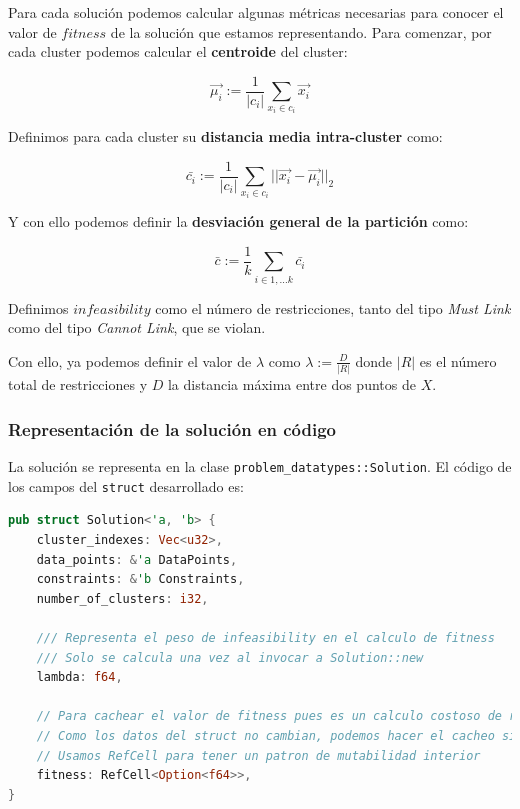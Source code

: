 \documentclass[11pt]{article}
\begin{document}
Para cada solución podemos calcular algunas métricas necesarias para conocer el valor de $fitness$ de la solución que estamos representando. Para comenzar, por cada cluster podemos calcular el \textbf{centroide} del cluster:

\begin{displaymath}
    \vec{\mu_i} := \frac{1}{|c_i|} \sum_{x_i \in c_i} \vec{x_i}
\end{displaymath}

Definimos para cada cluster su \textbf{distancia media intra-cluster} como:

\begin{displaymath}
    \bar{c_i} := \frac{1}{|c_i|} \sum_{x_i \in c_i} || \vec{x_i} - \vec{\mu_i} ||_2
\end{displaymath}

Y con ello podemos definir la \textbf{desviación general de la partición} como:

\begin{displaymath}
    \bar{c} := \frac{1}{k} \sum_{i \in 1, \ldots k} \bar{c_i}
\end{displaymath}

Definimos $infeasibility$ como el número de restricciones, tanto del tipo \emph{Must Link} como del tipo \emph{Cannot Link}, que se violan.

Con ello, ya podemos definir el valor de $\lambda$ como $\lambda := \frac{D}{|R|}$ donde $|R|$ es el número total de restricciones y $D$ la distancia máxima entre dos puntos de $X$.


\subsubsection{Representación de la solución en código}

La solución se representa en la clase \lstinline{problem_datatypes::Solution}. El código de los campos del \lstinline{struct} desarrollado es:

\begin{lstlisting}[language=Rust, style=Boxed]
pub struct Solution<'a, 'b> {
    cluster_indexes: Vec<u32>,
    data_points: &'a DataPoints,
    constraints: &'b Constraints,
    number_of_clusters: i32,

    /// Representa el peso de infeasibility en el calculo de fitness
    /// Solo se calcula una vez al invocar a Solution::new
    lambda: f64,

    // Para cachear el valor de fitness pues es un calculo costoso de realizar
    // Como los datos del struct no cambian, podemos hacer el cacheo sin miedo
    // Usamos RefCell para tener un patron de mutabilidad interior
    fitness: RefCell<Option<f64>>,
}
\end{lstlisting}
\end{document}

